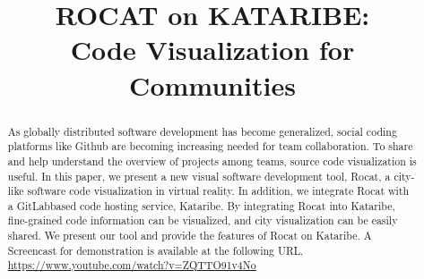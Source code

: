 \documentclass[conference]{IEEEtran}
\begin{document}
\title{ROCAT on KATARIBE:\\ Code Visualization for Communities}

\author{

}

\maketitle

\begin{abstract}
As globally distributed software development has become generalized, social coding platforms like Github are becoming increasing needed for team collaboration. 
To share and help understand the overview of projects among teams, source code visualization is useful. 
In this paper, we present a new visual software development tool, Rocat, a  city-like software code visualization in virtual reality.
In addition, we integrate Rocat with a GitLabbased code hosting service, Kataribe. By integrating Rocat into Kataribe, fine-grained code information can be visualized, and city visualization can be easily shared. 
We present our tool and provide the features of Rocat on Kataribe.
A Screencast for demonstration is available at the following URL.\\
\url{https://www.youtube.com/watch?v=ZQTTO91v4No}
\end{abstract}
\end{document}
